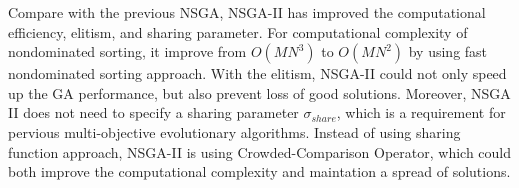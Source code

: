 Compare with the previous NSGA, NSGA-II has improved the computational efficiency, elitism, and sharing parameter\cite{NSGA_II}. For computational complexity of nondominated sorting, it improve from \(O(MN^{3})\) to \(O(MN^{2})\) by using fast nondominated sorting approach\cite{NSGA_II}. With the elitism, NSGA-II could not only speed up the GA performance, but also prevent loss of good solutions. Moreover, NSGA II does not need to specify a sharing parameter \(\sigma_{share}\), which is a requirement for pervious multi-objective evolutionary algorithms. Instead of using sharing function approach, NSGA-II is using Crowded-Comparison Operator, which could both improve the computational complexity and maintation a spread of solutions.


